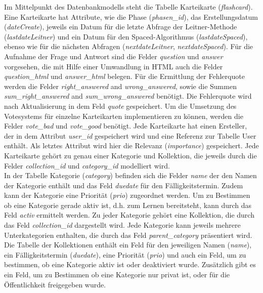 \noindent Im Mittelpunkt des Datenbankmodells steht die Tabelle Karteikarte (\emph{flashcard}). Eine Karteikarte hat Attribute, wie die Phase (\emph{phasen{\_}id}), das Erstellungsdatum (\emph{dateCreate}), jeweils ein Datum für die letzte Abfrage der Leitner-Methode (\emph{lastdateLeitner}) und ein Datum für den Spaced-Algorithmus (\emph{lastdateSpaced}), ebenso wie für die nächsten Abfragen (\emph{nextdateLeitner}, \emph{nextdateSpaced}). Für die Aufnahme der Frage und Antwort sind die Felder \emph{question} und \emph{answer} vorgesehen, die mit Hilfe einer Umwandlung in HTML auch die Felder \emph{question{\_}html} und \emph{answer{\_}html} belegen. Für die Ermittlung der Fehlerquote werden die Felder \emph{right{\_}answered} and \emph{wrong{\_}answered}, sowie die Summen \emph{sum{\_}right{\_}answered} and \emph{sum{\_}wrong{\_}answered} benötigt. Die Fehlerquote wird nach Aktualisierung in dem Feld \emph{quote} gespeichert. Um die Umsetzung des Votesystems für einzelne Karteikarten implementieren zu können, werden die Felder \emph{vote{\_}bad} und \emph{vote{\_}good} benötigt. Jede Karteikarte hat einen Ersteller, der in dem Attribut \emph{user{\_}id} gespeichert wird und eine Referenz zur Tabelle User enthält. Als letztes Attribut wird hier die Relevanz (\emph{importance}) gespeichert. Jede Karteikarte gehört zu genau einer Kategorie und Kollektion, die jeweils durch die Felder \emph{collection{\_}id} und \emph{category{\_}id} modelliert wird. \\

\noindent In der Tabelle Kategorie (\emph{category}) befinden sich die Felder \emph{name} der den Namen der Kategorie enthält und das Feld \emph{duedate} für den Fälligkeitstermin. Zudem kann der Kategorie eine Priorität (\emph{prio}) zugeordnet werden. Um zu Bestimmen ob eine Kategorie gerade aktiv ist, d.h. zum Lernen bereitsteht, kann durch das Feld \emph{activ} ermittelt werden. Zu jeder Kategorie gehört eine Kollektion, die durch das Feld \emph{collection{\_}id} dargestellt wird. Jede Kategorie kann jeweils mehrere Unterkategorien enthalten, die durch das Feld \emph{parent{\_}category} präsentiert wird. \\

\noindent Die Tabelle der Kollektionen enthält ein Feld für den jeweiligen Namen (\emph{name}), ein Fälligkeitstermin (\emph{duedate}), eine Priorität (\emph{prio}) und auch ein Feld, um zu bestimmen, ob eine Kategorie aktiv ist oder deaktiviert wurde. Zusätzlich gibt es ein Feld, um zu Bestimmen ob eine Kategorie nur privat ist, oder für die Öffentlichkeit freigegeben wurde. \\

